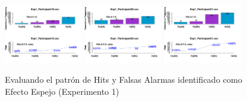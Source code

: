\begin{figure}[th]
\includegraphics[width=0.30\textwidth]{Figures/MirrorRate_Exp1_P19} \includegraphics[width=0.30\textwidth]{Figures/MirrorRate_Exp1_P20} \includegraphics[width=0.30\textwidth]{Figures/MirrorRate_Exp1_P21} 
\caption[Rate_Exp1]{Evaluando el patrón de Hits y Falsas Alarmas identificado como Efecto Espejo (Experimento 1)}
\label{fig:Rate_E1}
\end{figure}

